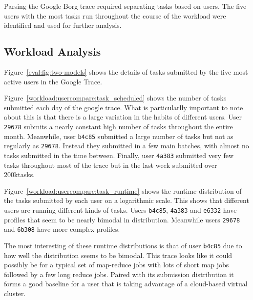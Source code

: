 Parsing the Google Borg trace required separating tasks based on users.
The five users with the most tasks run throughout the course of the workload were identified and used for further analysis.

\subsection{Workload Analysis}
\label{workload.analysis}

Figure~\ref{eval:fig:two-models} shows the details of tasks submitted by the five most active users in the Google Trace.
\par

Figure~\ref{workload:usercompare:task_scheduled} shows the number of tasks submitted each day of the google trace.
What is particularlly important to note about this is that there is a large variation in the habits of different users.
User \texttt{29678} submits a nearly constant high number of tasks throughout the entire month.  
Meanwhile, user \texttt{b4c85} submitted a large number of tasks but not as regularly as \texttt{29678}.  Instead they submitted in a few main batches, with almost no tasks submitted in the time between.
Finally, user \texttt{4a383} submitted very few tasks throughout most of the trace but in the last week submitted over 200ktasks.
\par

Figure~\ref{workload:usercompare:task_runtime} shows the runtime distribution of the tasks submitted by each user on a logarithmic scale.
This shows that different users are running different kinds of tasks.
Users \texttt{b4c85}, \texttt{4a383} and \texttt{e6332} have profiles that seem to be nearly bimodal in distribution.
Meanwhile users \texttt{29678} and \texttt{6b308} have more complex profiles.
\par

The most interesting of these runtime distributions is that of user \texttt{b4c85} due to how well the distribution seems to be bimodal.
This trace looks like it could possibly be for a typical set of map-reduce jobs with lots of short map jobs followed by a few long reduce jobs.
Paired with its submission distribution it forms a good baseline for a user that is taking advantage of a cloud-based virtual cluster.



